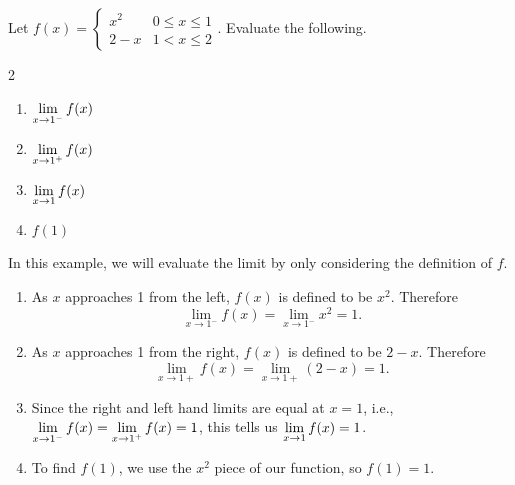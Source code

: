 \begin{example}\label{ex_onesided}%
Let $f(x) = \begin{cases} x^2 & 0\leq x\leq 1 \\ 2-x & 1<x\leq 2\end{cases}$. Evaluate the following.
\begin{multicols}{2}
	\begin{enumerate}
		\item	$\displaystyle \lim_{x\to 1^-} f(x)$
		\item	$\displaystyle \lim_{x\to 1^+} f(x)$
		\item	$\displaystyle \lim_{x\to 1} f(x)$
		\item	$f(1)$
	\end{enumerate}
\end{multicols}
\solution
In this example, we will evaluate the limit by only considering the definition of $f$.
\begin{enumerate}
	\item	As $x$ approaches 1 from the left, $f(x)$ is defined to be $x^2$. Therefore \[\lim_{x\to1^-} f(x)=\lim_{x\to1^-} x^2=1.\]
	\item	As $x$ approaches 1 from the right, $f(x)$ is defined to be $2-x$. Therefore \[\lim_{x\to 1+} f(x)=\lim_{x\to 1+}(2-x)=1.\]
	\item	Since the right and left hand limits are equal at $x=1$, i.e., $\displaystyle \lim_{x\to1^-} f(x)=\displaystyle \lim_{x\to1^+} f(x)=1$, this tells us $\displaystyle \lim_{x\to1} f(x)=1$.
	\item	To find $f(1)$, we use the $x^2$ piece of our function, so $f(1)=1$.
\end{enumerate}
\end{example}

